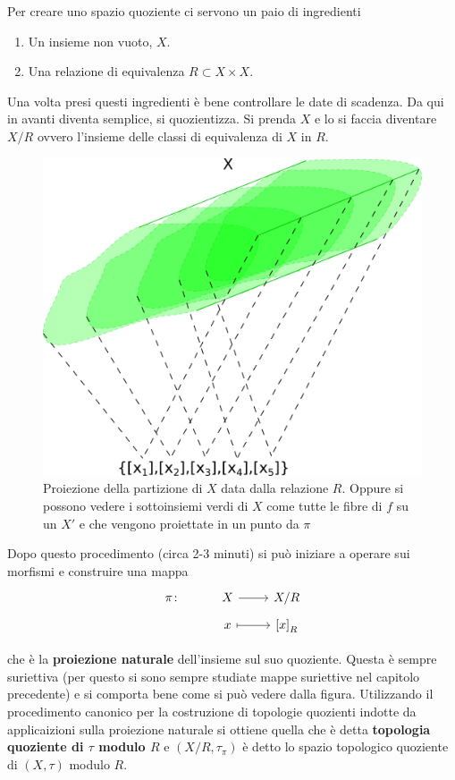 Per creare uno spazio quoziente ci servono un paio di ingredienti
\begin{enumerate}
	\item Un insieme non vuoto, $X$.
	\item Una relazione di equivalenza $R \subset X \times X$.
\end{enumerate}

Una volta presi questi ingredienti è bene controllare le date di scadenza. Da qui in avanti diventa semplice, si quozientizza. Si prenda $X$ e lo si faccia diventare $X / R$ ovvero l'insieme delle classi di equivalenza di $X$ in $R$. 

\begin{figure}[h]
	\centering
	\includegraphics[width=0.5\linewidth]{images/topologia_generale/projection_quotient}
	\caption{Proiezione della partizione di $X$ data dalla relazione $R$. Oppure si possono vedere i sottoinsiemi verdi di $X$ come tutte le fibre di $f$ su un $X'$ e che vengono proiettate in un punto da $\pi$}
	\label{fig:projectionquotient}
\end{figure}

Dopo questo procedimento (circa 2-3 minuti) si può iniziare a operare sui morfismi e construire una mappa 
\begin{equation*}
\begin{tikzcd}[row sep = tiny]
	\pi  \colon &  X \arrow{r} & X/R \\
		 & x \arrow[mapsto]{r} & \left[x\right]_R
\end{tikzcd}
\end{equation*}


che è la \textbf{proiezione naturale} dell'insieme sul suo quoziente. Questa è sempre suriettiva (per questo si sono sempre studiate mappe suriettive nel capitolo precedente) e si comporta bene come si può vedere dalla figura. Utilizzando il procedimento canonico per la costruzione di topologie quozienti indotte da applicaizioni sulla proiezione naturale si ottiene quella che è detta \textbf{topologia quoziente di $\tau$ modulo $R$} e $(X/R, \tau_\pi)$ è detto lo spazio topologico quoziente di $(X,\tau)$ modulo $R$.

